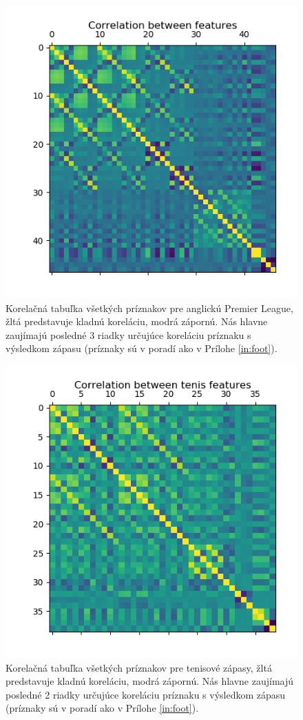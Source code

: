 \noindent
\begin{figure} \label{corr}
\includegraphics[scale=0.9]{../img/correng.png}
\caption{Korelačná tabuľka všetkých príznakov pre anglickú Premier League, žltá predstavuje kladnú koreláciu, modrá zápornú. Nás hlavne zaujímajú posledné 3 riadky určujúce koreláciu príznaku s výsledkom zápasu (príznaky sú v poradí ako v Prílohe \ref{in:foot}).}
\end{figure}
\begin{figure} \label{corr_atp}
\includegraphics[scale=0.9]{../img/corratp.png}
\caption{Korelačná tabuľka všetkých príznakov pre tenisové zápasy, žltá predstavuje kladnú koreláciu, modrá zápornú. Nás hlavne zaujímajú posledné 2 riadky určujúce koreláciu príznaku s výsledkom zápasu (príznaky sú v poradí ako v Prílohe \ref{in:foot}).}
\end{figure}

